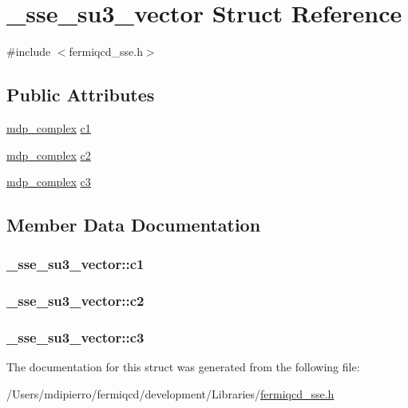 \hypertarget{struct__sse__su3__vector}{
\section{\_\-sse\_\-su3\_\-vector Struct Reference}
\label{struct__sse__su3__vector}
}


{\ttfamily \#include $<$fermiqcd\_\-sse.h$>$}\subsection*{Public Attributes}
\begin{DoxyCompactItemize}
\item 
\hyperlink{classmdp__complex}{mdp\_\-complex} \hyperlink{struct__sse__su3__vector_a96f3613a42f140bdb518b4a0ce582794}{c1}
\item 
\hyperlink{classmdp__complex}{mdp\_\-complex} \hyperlink{struct__sse__su3__vector_a4500035ad4797d9961e5c3c008a2c78d}{c2}
\item 
\hyperlink{classmdp__complex}{mdp\_\-complex} \hyperlink{struct__sse__su3__vector_a51d7f43917a8cce0f86caf5189edabd0}{c3}
\end{DoxyCompactItemize}


\subsection{Member Data Documentation}
\hypertarget{struct__sse__su3__vector_a96f3613a42f140bdb518b4a0ce582794}{
\subsubsection[{c1}]{ {\bf \_\-sse\_\-su3\_\-vector::c1}}}
\label{struct__sse__su3__vector_a96f3613a42f140bdb518b4a0ce582794}
\hypertarget{struct__sse__su3__vector_a4500035ad4797d9961e5c3c008a2c78d}{
\subsubsection[{c2}]{ {\bf \_\-sse\_\-su3\_\-vector::c2}}}
\label{struct__sse__su3__vector_a4500035ad4797d9961e5c3c008a2c78d}
\hypertarget{struct__sse__su3__vector_a51d7f43917a8cce0f86caf5189edabd0}{
\subsubsection[{c3}]{ {\bf \_\-sse\_\-su3\_\-vector::c3}}}
\label{struct__sse__su3__vector_a51d7f43917a8cce0f86caf5189edabd0}


The documentation for this struct was generated from the following file:\begin{DoxyCompactItemize}
\item 
/Users/mdipierro/fermiqcd/development/Libraries/\hyperlink{fermiqcd__sse_8h}{fermiqcd\_\-sse.h}\end{DoxyCompactItemize}
